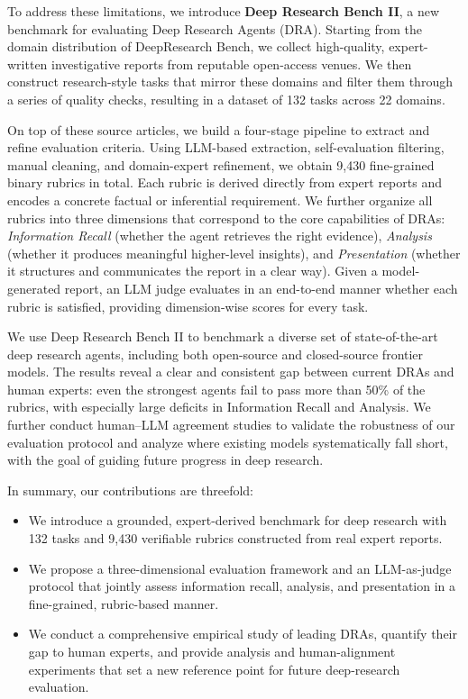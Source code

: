 \documentclass[11pt]{article}
\begin{document}
To address these limitations, we introduce \textbf{Deep Research Bench II}, a new benchmark for evaluating Deep Research Agents (DRA). Starting from the domain distribution of DeepResearch Bench, we collect high-quality, expert-written investigative reports from reputable open-access venues. We then construct research-style tasks that mirror these domains and filter them through a series of quality checks, resulting in a dataset of 132 tasks across 22 domains.

On top of these source articles, we build a four-stage pipeline to extract and refine evaluation criteria. Using LLM-based extraction, self-evaluation filtering, manual cleaning, and domain-expert refinement, we obtain 9{,}430 fine-grained binary rubrics in total. Each rubric is derived directly from expert reports and encodes a concrete factual or inferential requirement. We further organize all rubrics into three dimensions that correspond to the core capabilities of DRAs: \emph{Information Recall} (whether the agent retrieves the right evidence), \emph{Analysis} (whether it produces meaningful higher-level insights), and \emph{Presentation} (whether it structures and communicates the report in a clear way). Given a model-generated report, an LLM judge evaluates in an end-to-end manner whether each rubric is satisfied, providing dimension-wise scores for every task.

We use Deep Research Bench II to benchmark a diverse set of state-of-the-art deep research agents, including both open-source and closed-source frontier models. The results reveal a clear and consistent gap between current DRAs and human experts: even the strongest agents fail to pass more than 50\% of the rubrics, with especially large deficits in Information Recall and Analysis. We further conduct human–LLM agreement studies to validate the robustness of our evaluation protocol and analyze where existing models systematically fall short, with the goal of guiding future progress in deep research.

In summary, our contributions are threefold:
\begin{itemize}
    \item We introduce a grounded, expert-derived benchmark for deep research with 132 tasks and 9{,}430 verifiable rubrics constructed from real expert reports.
    \item We propose a three-dimensional evaluation framework and an LLM-as-judge protocol that jointly assess information recall, analysis, and presentation in a fine-grained, rubric-based manner.
    \item We conduct a comprehensive empirical study of leading DRAs, quantify their gap to human experts, and provide analysis and human-alignment experiments that set a new reference point for future deep-research evaluation.
\end{itemize}
\end{document}
